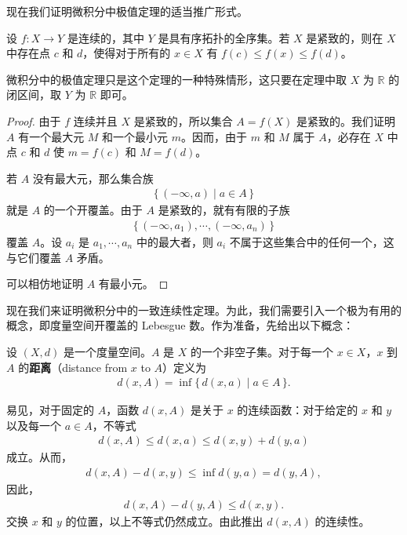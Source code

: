 现在我们证明微积分中极值定理的适当推广形式。

\begin{theorem}[极值定理]\label{theorem:ch03-extreme-value}
设 $f\colon X\to Y$ 是连续的，其中 $Y$ 是具有序拓扑的全序集。若 $X$ 是紧致的，则在 $X$ 中存在点 $c$ 和 $d$，使得对于所有的 $x\in X$ 有 $f(c)\leqslant f(x)\leqslant f(d)$。
\end{theorem}

微积分中的极值定理只是这个定理的一种特殊情形，这只要在定理中取 $X$ 为 $\mathbb{R}$ 的闭区间，取 $Y$ 为 $\mathbb{R}$ 即可。

\begin{proof}
由于 $f$ 连续并且 $X$ 是紧致的，所以集合 $A=f(X)$ 是紧致的。我们证明 $A$ 有一个最大元 $M$ 和一个最小元 $m$。因而，由于 $m$ 和 $M$ 属于 $A$，必存在 $X$ 中点 $c$ 和 $d$ 使 $m=f(c)$ 和 $M=f(d)$。

若 $A$ 没有最大元，那么集合族
\begin{align*}
\{\,(-\infty,a)\mid a\in A\,\}
\end{align*}
就是 $A$ 的一个开覆盖。由于 $A$ 是紧致的，就有有限的子族
\begin{align*}
\{\,(-\infty,a_{1}),\cdots,(-\infty,a_{n})\,\}
\end{align*}
覆盖 $A$。设 $a_{i}$ 是 $a_{1},\cdots,a_{n}$ 中的最大者，则 $a_{i}$ 不属于这些集合中的任何一个，这与它们覆盖 $A$ 矛盾。

可以相仿地证明 $A$ 有最小元。
\end{proof}

现在我们来证明微积分中的一致连续性定理。为此，我们需要引入一个极为有用的概念，即度量空间开覆盖的 Lebesgue 数。作为准备，先给出以下概念：

\begin{definition}\label{definition:ch03-distance}
设 $(X,d)$ 是一个度量空间。$A$ 是 $X$ 的一个非空子集。对于每一个 $x\in X$，$x$ 到 $A$ 的\textbf{距离}（distance from $x$ to $A$）定义为
\begin{align*}
d(x,A)=\inf\{\,d(x,a)\mid a\in A\,\}.
\end{align*}
\end{definition}

易见，对于固定的 $A$，函数 $d(x,A)$ 是关于 $x$ 的连续函数：对于给定的 $x$ 和 $y$ 以及每一个 $a\in A$，不等式
\begin{align*}
d(x,A)\leqslant d(x,a)\leqslant d(x,y)+d(y,a)
\end{align*}
成立。从而，
\begin{align*}
d(x,A)-d(x,y)\leqslant\inf d(y,a)=d(y,A),
\end{align*}
因此，
\begin{align*}
d(x,A)-d(y,A)\leqslant d(x,y).
\end{align*}
交换 $x$ 和 $y$ 的位置，以上不等式仍然成立。由此推出 $d(x,A)$ 的连续性。

